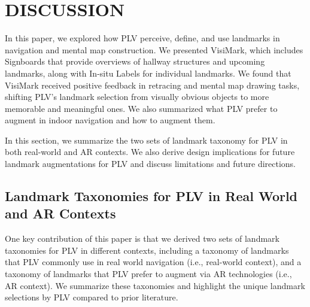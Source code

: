 \section{DISCUSSION} 

In this paper, we explored how PLV perceive, define, and use landmarks in navigation and mental map construction. We presented VisiMark, which includes Signboards that provide overviews of hallway structures and upcoming landmarks, along with In-situ Labels for individual landmarks. We found that VisiMark received positive feedback in retracing and mental map drawing tasks, shifting PLV's landmark selection from visually obvious objects to more memorable and meaningful ones. We also summarized what PLV prefer to augment in indoor navigation and how to augment them.

In this section, we summarize the two sets of landmark taxonomy for PLV in both real-world and AR contexts. We also derive design implications for future landmark augmentations for PLV and discuss limitations and future directions.

\subsection{Landmark Taxonomies for PLV in Real World and AR Contexts}
One key contribution of this paper is that we derived two sets of landmark taxonomies for PLV in different contexts, including a taxonomy of landmarks that PLV commonly use in real world navigation (i.e., real-world context), and a taxonomy of landmarks that PLV prefer to augment via AR technologies (i.e., AR context). We summarize these taxonomies and highlight the unique landmark selections by PLV compared to prior literature. 

